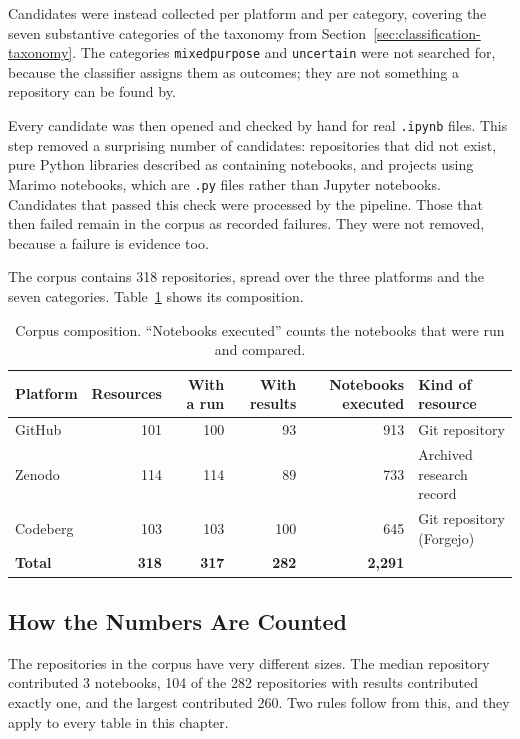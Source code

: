 Candidates were instead collected per platform and per category, covering the seven substantive categories of the taxonomy from Section~\ref{sec:classification-taxonomy}. The categories \texttt{mixed\ub purpose} and \texttt{uncertain} were not searched for, because the classifier assigns them as outcomes; they are not something a repository can be found by.

Every candidate was then opened and checked by hand for real \texttt{.ipynb} files. This step removed a surprising number of candidates: repositories that did not exist, pure Python libraries described as containing notebooks, and projects using Marimo notebooks, which are \texttt{.py} files rather than Jupyter notebooks. Candidates that passed this check were processed by the pipeline. Those that then failed remain in the corpus as recorded failures. They were not removed, because a failure is evidence too.

The corpus contains 318 repositories, spread over the three platforms and the seven categories. Table~\ref{tab:corpus-composition} shows its composition.

\begin{table}[htbp]
\centering
\caption{Corpus composition. ``Notebooks executed'' counts the notebooks that were run and compared.}
\label{tab:corpus-composition}
\small
\begin{tabularx}{\textwidth}{@{}l r r r r >{\raggedright\arraybackslash}p{3.6cm}@{}}
\toprule
Platform & Resources & With a run & With results & Notebooks executed & Kind of resource\tabularnewline
\midrule
GitHub & 101 & 100 & 93 & 913 & Git repository\tabularnewline
Zenodo & 114 & 114 & 89 & 733 & Archived research record\tabularnewline
Codeberg & 103 & 103 & 100 & 645 & Git repository (Forgejo)\tabularnewline
\midrule
\textbf{Total} & \textbf{318} & \textbf{317} & \textbf{282} & \textbf{2{,}291} & \tabularnewline
\bottomrule
\end{tabularx}
\end{table}

\subsection{How the Numbers Are Counted}
\label{sec:eval-counting}

The repositories in the corpus have very different sizes. The median repository contributed 3 notebooks, 104 of the 282 repositories with results contributed exactly one, and the largest contributed 260. Two rules follow from this, and they apply to every table in this chapter.

